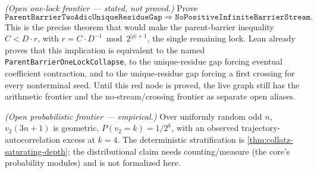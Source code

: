\begin{theorem}
  \label{thm:collatz-two-adic-unique-one-lock-frontier}
  \notready
  \emph{(Open one-lock frontier --- stated, not proved.)} Prove
  \[
    \texttt{ParentBarrierTwoAdicUniqueResidueGap}
      \Longrightarrow \texttt{NoPositiveInfiniteBarrierStream}.
  \]
  This is the precise theorem that would make the parent-barrier inequality
  \(C<D\cdot r\), with \(r=C\cdot D^{-1}\bmod 2^{|p|+1}\), the single remaining
  lock. Lean already proves that this implication is equivalent to the named
  \texttt{ParentBarrierOneLockCollapse}, to the unique-residue gap forcing
  eventual coefficient contraction, and to the unique-residue gap forcing a first
  crossing for every nonterminal seed. Until this red node is proved, the live
  graph still has the arithmetic frontier and the no-stream/crossing frontier as
  separate open aliases.
\end{theorem}
\begin{theorem}
  \label{thm:collatz-v2-geometric}
  \notready
  \emph{(Open probabilistic frontier --- empirical.)} Over uniformly random odd $n$,
  $v_2(3n+1)$ is geometric, $P(v_2=k)=1/2^k$, with an observed trajectory-autocorrelation excess
  at $k=4$. The deterministic stratification is \cref{thm:collatz-saturating-depth}; the
  distributional claim needs counting/measure (the core's probability modules) and is not
  formalized here.
\end{theorem}
